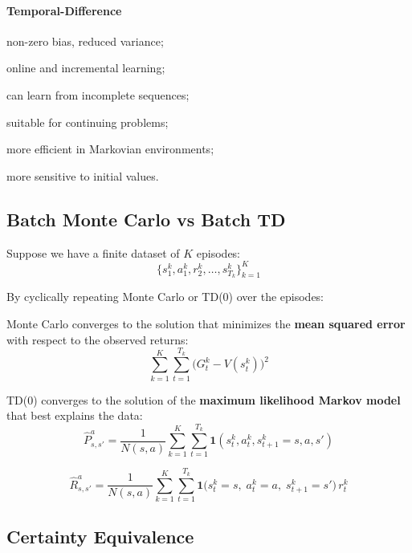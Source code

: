 \paragraph{Temporal-Difference}
\begin{compactitemize}
    \item non-zero bias, reduced variance;
    \item online and incremental learning;
    \item can learn from incomplete sequences;
    \item suitable for continuing problems;
    \item more efficient in Markovian environments;
    \item more sensitive to initial values.
\end{compactitemize}

\subsection{Batch Monte Carlo vs Batch TD}

Suppose we have a finite dataset of $K$ episodes:
\[
\{ s_1^k, a_1^k, r_2^k, \dots, s_{T_k}^k \}_{k=1}^K
\]

By cyclically repeating Monte Carlo or TD(0) over the episodes:

\begin{compactitemize}
    \item Monte Carlo converges to the solution that minimizes the \textbf{mean squared error}
    with respect to the observed returns:
    \[
    \sum_{k=1}^K \sum_{t=1}^{T_k}
    \big(
    G_t^k - V(s_t^k)
    \big)^2
    \]
    \item TD(0) converges to the solution of the \textbf{maximum likelihood Markov model}
    that best explains the data:
    \[
    \hat{P}_{s,s'}^a
    =
    \frac{1}{N(s,a)}
    \sum_{k=1}^K
    \sum_{t=1}^{T_k}
    \mathbf{1}(s_t^k, a_t^k, s_{t+1}^k = s,a,s')
    \]

    \[
    \hat{R}_{s,s'}^{a}
    =
    \frac{1}{N(s,a)}
    \sum_{k=1}^{K}
    \sum_{t=1}^{T_k}
    \mathbf{1}
    \big(
    s_t^{k} = s,\;
    a_t^{k} = a,\;
    s_{t+1}^{k} = s'
    \big)
    \, r_t^{k}
    \]

\end{compactitemize}

\subsection{Certainty Equivalence}

